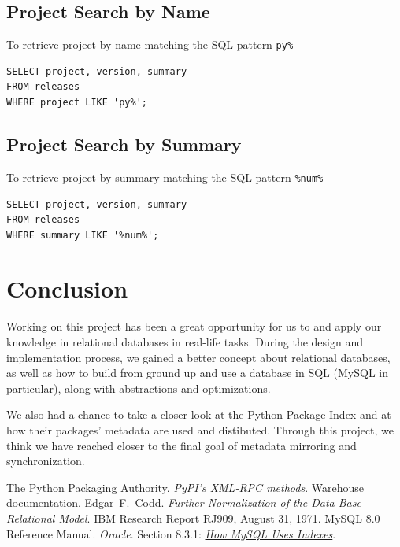 \documentclass[a4paper,12pt]{article}
\begin{document}
\subsection{Project Search by Name}
To retrieve project by name matching the SQL pattern \verb|py%|
\begin{verbatim}
SELECT project, version, summary
FROM releases
WHERE project LIKE 'py%';
\end{verbatim}

\subsection{Project Search by Summary}
To retrieve project by summary matching the SQL pattern \verb|%num%|
\begin{verbatim}
SELECT project, version, summary
FROM releases
WHERE summary LIKE '%num%';
\end{verbatim}

\section{Conclusion}
Working on this project has been a great opportunity for us to and apply
our knowledge in relational databases in real-life tasks.
During the design and implementation process, we gained a better concept
about relational databases, as well as how to build from ground up and use
a database in SQL (MySQL in particular), along with abstractions
and optimizations.

We also had a chance to take a closer look at the Python Package Index
and at how their packages' metadata are used and distibuted.  Through
this project, we think we have reached closer to the final goal of
metadata mirroring and synchronization.

\begin{thebibliography}{69}
   The Python Packaging Authority.
    \href{https://warehouse.readthedocs.io/api-reference/xml-rpc}
         {\emph{PyPI’s XML-RPC methods}}.
    Warehouse documentation.
   Edgar~F.~Codd.
    \emph{Further Normalization of the Data Base Relational Model}.
    IBM Research Report RJ909, August 31, 1971.
   MySQL 8.0 Reference Manual.
    \emph{Oracle}.  Section 8.3.1:
    \href{https://dev.mysql.com/doc/refman/8.0/en/mysql-indexes.html}
         {\emph{How MySQL Uses Indexes}}.
\end{thebibliography}
\end{document}
